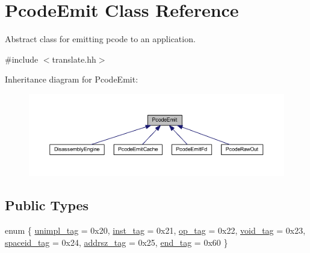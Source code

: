 \hypertarget{class_pcode_emit}{}\section{Pcode\+Emit Class Reference}
\label{class_pcode_emit}


Abstract class for emitting pcode to an application.  




{\ttfamily \#include $<$translate.\+hh$>$}



Inheritance diagram for Pcode\+Emit\+:
\nopagebreak
\begin{figure}[H]
\begin{center}
\leavevmode
\includegraphics[width=350pt]{class_pcode_emit__inherit__graph}
\end{center}
\end{figure}
\subsection*{Public Types}
\begin{DoxyCompactItemize}
\item 
enum \{ \newline
\mbox{\hyperlink{class_pcode_emit_a95e8a4cd96ea2cd38102668ac2581482a6d0dba96f7de07e739f1fe0ae5cdb1dd}{unimpl\+\_\+tag}} = 0x20, 
\mbox{\hyperlink{class_pcode_emit_a95e8a4cd96ea2cd38102668ac2581482a61aec01488b532f94d397704e2dbb232}{inst\+\_\+tag}} = 0x21, 
\mbox{\hyperlink{class_pcode_emit_a95e8a4cd96ea2cd38102668ac2581482ac55070c979036389521fdc4df6006da6}{op\+\_\+tag}} = 0x22, 
\mbox{\hyperlink{class_pcode_emit_a95e8a4cd96ea2cd38102668ac2581482a7553717ede697faf9fc8dca8aedf5637}{void\+\_\+tag}} = 0x23, 
\newline
\mbox{\hyperlink{class_pcode_emit_a95e8a4cd96ea2cd38102668ac2581482aca932484edb2250c8e099aab22678480}{spaceid\+\_\+tag}} = 0x24, 
\mbox{\hyperlink{class_pcode_emit_a95e8a4cd96ea2cd38102668ac2581482a7497bc60107d45cb836c9e954fb768bb}{addrsz\+\_\+tag}} = 0x25, 
\mbox{\hyperlink{class_pcode_emit_a95e8a4cd96ea2cd38102668ac2581482a76198c2539b5966aa2b741a40de8dd58}{end\+\_\+tag}} = 0x60
 \}
\end{DoxyCompactItemize}
